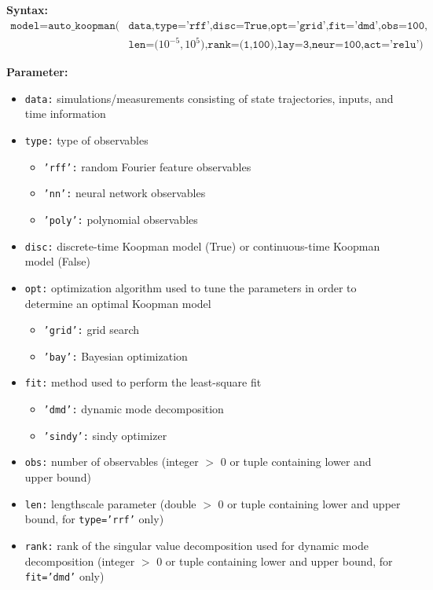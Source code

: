\documentclass{article}
\begin{document}
\noindent \textbf{Syntax:}
\begin{equation*}
	\begin{split}
	\texttt{model} = \texttt{auto\_koopman(}&\texttt{data,type='rff',disc=True,opt='grid',fit='dmd',obs=100,} \\
	& \texttt{len=(}10^{-5},10^5\texttt{),rank=(1,100),lay=3,neur=100,act='relu')}
	\end{split}
\end{equation*}

\noindent \textbf{Parameter:}

\begin{itemize}
	\item \texttt{data:} simulations/measurements consisting of state trajectories, inputs, and time information
	\item \texttt{type:} type of observables
		\begin{itemize}
			\item \texttt{'rff':} random Fourier feature observables
			\item \texttt{'nn':} neural network observables
			\item \texttt{'poly':} polynomial observables
		\end{itemize}
	\item \texttt{disc:} discrete-time Koopman model (True) or continuous-time Koopman model (False)
	\item \texttt{opt:} optimization algorithm used to tune the parameters in order to determine an optimal Koopman model
		\begin{itemize}
			\item \texttt{'grid':} grid search
			\item \texttt{'bay':} Bayesian optimization
		\end{itemize}
	\item \texttt{fit:} method used to perform the least-square fit
		\begin{itemize}
			\item \texttt{'dmd':} dynamic mode decomposition
			\item \texttt{'sindy':} sindy optimizer
		\end{itemize}
	\item \texttt{obs:} number of observables (integer $>$ 0 or tuple containing lower and upper bound)
	\item \texttt{len:} lengthscale parameter (double $>$ 0 or tuple containing lower and upper bound, for \texttt{type='rrf'} only)
	\item \texttt{rank:} rank of the singular value decomposition used for dynamic mode decomposition (integer $>$ 0 or tuple containing lower and upper bound, for \texttt{fit='dmd'} only)

\end{itemize}
\end{document}
